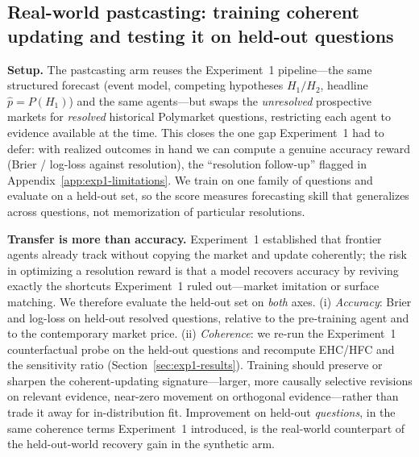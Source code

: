 \subsection{Real-world pastcasting: training coherent updating and testing it on held-out questions}
\label{sec:exp3-pastcasting}

\textbf{Setup.}  The pastcasting arm reuses the Experiment~1 pipeline---the same structured forecast
(event model, competing hypotheses $H_1/H_2$, headline $\hat p = P(H_1)$) and the same agents---but
swaps the \emph{unresolved} prospective markets for \emph{resolved} historical Polymarket questions,
restricting each agent to evidence available at the time. This closes the one gap Experiment~1 had to
defer: with realized outcomes in hand we can compute a genuine accuracy reward (Brier / log-loss against
resolution), the ``resolution follow-up'' flagged in Appendix~\ref{app:exp1-limitations}. We train on
one family of questions and evaluate on a held-out set, so the score measures forecasting skill that
generalizes across questions, not memorization of particular resolutions.

\textbf{Transfer is more than accuracy.}  Experiment~1 established that frontier agents already track
without copying the market and update coherently; the risk in optimizing a resolution reward is that a
model recovers accuracy by reviving exactly the shortcuts Experiment~1 ruled out---market imitation or
surface matching. We therefore evaluate the held-out set on \emph{both} axes. (i) \emph{Accuracy}: Brier
and log-loss on held-out resolved questions, relative to the pre-training agent and to the contemporary
market price. (ii) \emph{Coherence}: we re-run the Experiment~1 counterfactual probe on the held-out
questions and recompute EHC/HFC and the sensitivity ratio
(Section~\ref{sec:exp1-results}). Training should preserve or sharpen the coherent-updating
signature---larger, more causally selective revisions on relevant evidence, near-zero movement on
orthogonal evidence---rather than trade it away for in-distribution fit. Improvement on held-out
\emph{questions}, in the same coherence terms Experiment~1 introduced, is the real-world counterpart of
the held-out-world recovery gain in the synthetic arm.

